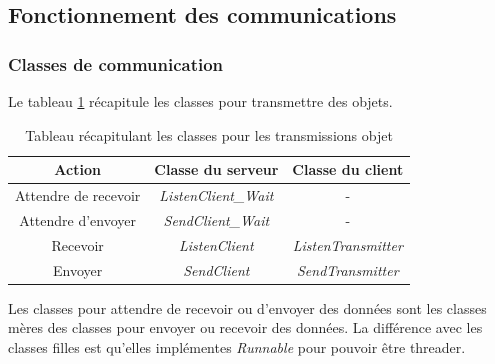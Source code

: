 \documentclass[a4paper,11pt]{report}
\begin{document}
\subsection{Fonctionnement des communications}

\subsubsection{Classes de communication}
Le tableau \ref{tab1comClasses} récapitule les classes pour transmettre des objets.

  \begin{table}
    \begin{center}
      \begin{tabular}{|c|c|c|}
         \hline \textbf{Action}&\textbf{Classe du serveur}&\textbf{Classe du client} \\
         \hline Attendre de recevoir&\textit{ListenClient\_Wait}&- \\
         \hline Attendre d’envoyer&\textit{SendClient\_Wait}&- \\
         \hline Recevoir&\textit{ListenClient}&\textit{ListenTransmitter} \\
         \hline Envoyer&\textit{SendClient}&\textit{SendTransmitter}\\
         \hline
      \end{tabular}
      \caption{Tableau récapitulant les classes pour les transmissions objet}  
      \label{tab1comClasses}
    \end{center}
  \end{table}
  
  Les classes pour attendre de recevoir ou d’envoyer des données sont les classes mères des classes pour envoyer ou recevoir des données. La différence avec les classes filles est qu’elles implémentes \textit{Runnable} pour pouvoir être threader.
\end{document}

